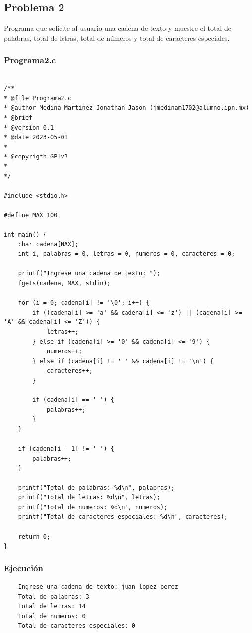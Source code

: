 \documentclass{article}
\begin{document}
	\newpage
	
	\subsection{Problema 2}
	
	Programa que solicite al usuario una cadena de texto y muestre el total de palabras, total de letras, total de números y total de caracteres especiales.
	
	\subsubsection{Programa2.c}
	
	\begin{lstlisting}
		
/**
* @file Programa2.c
* @author Medina Martinez Jonathan Jason (jmedinam1702@alumno.ipn.mx)
* @brief 
* @version 0.1
* @date 2023-05-01
* 
* @copyrigth GPlv3
* 
*/

#include <stdio.h>

#define MAX 100

int main() {
	char cadena[MAX];
	int i, palabras = 0, letras = 0, numeros = 0, caracteres = 0;
	
	printf("Ingrese una cadena de texto: ");
	fgets(cadena, MAX, stdin);
	
	for (i = 0; cadena[i] != '\0'; i++) {
		if ((cadena[i] >= 'a' && cadena[i] <= 'z') || (cadena[i] >= 'A' && cadena[i] <= 'Z')) {
			letras++;
		} else if (cadena[i] >= '0' && cadena[i] <= '9') {
			numeros++;
		} else if (cadena[i] != ' ' && cadena[i] != '\n') {
			caracteres++;
		}
		
		if (cadena[i] == ' ') {
			palabras++;
		}
	}
	
	if (cadena[i - 1] != ' ') {
		palabras++;
	}
	
	printf("Total de palabras: %d\n", palabras);
	printf("Total de letras: %d\n", letras);
	printf("Total de numeros: %d\n", numeros);
	printf("Total de caracteres especiales: %d\n", caracteres);
	
	return 0;
}

	\end{lstlisting}
	
	\subsubsection{Ejecución}
	
	\begin{lstlisting}
	Ingrese una cadena de texto: juan lopez perez                     
	Total de palabras: 3
	Total de letras: 14
	Total de numeros: 0
	Total de caracteres especiales: 0
	\end{lstlisting}
	
\end{document}

